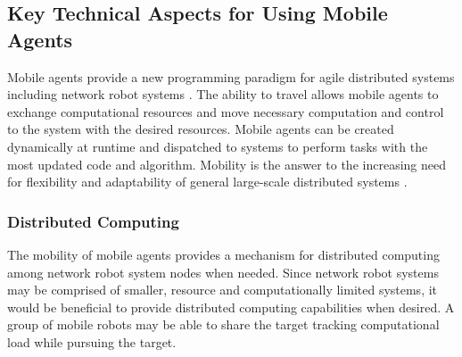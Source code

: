     \subsection{Key Technical Aspects for Using Mobile Agents}
      Mobile agents provide a new programming paradigm for agile distributed systems 
        including network robot systems \cite{Papaioannou2001}.
      The ability to travel allows mobile agents to exchange computational
        resources and move necessary computation and control to the system
        with the desired resources.
      Mobile agents can be created dynamically at runtime and dispatched to
        systems to perform tasks with the most updated code and algorithm.
      Mobility is the answer to the increasing need for flexibility and adaptability
        of general large-scale distributed systems \cite{Luck}.

%        

      \subsubsection{Distributed Computing}

        The mobility of mobile agents provides a mechanism for distributed 
          computing among network robot system nodes when needed.
        Since network robot systems may be comprised of smaller, resource
          and computationally limited systems, it would be beneficial to
          provide distributed computing capabilities when desired.
        A group of mobile robots may be able to share the target tracking
          computational load while pursuing the target.

